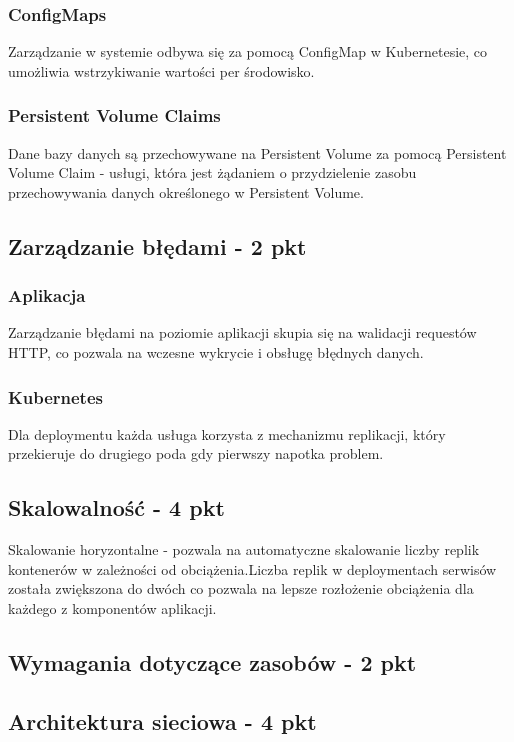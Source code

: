 \documentclass[12pt,a4paper]{article}
\begin{document}
\subsubsection {ConfigMaps} 
Zarządzanie w systemie odbywa się za pomocą ConfigMap w Kubernetesie, co umożliwia wstrzykiwanie wartości per środowisko.
\subsubsection {Persistent Volume Claims} 
Dane bazy danych są przechowywane na Persistent Volume za pomocą Persistent Volume Claim - usługi, która jest żądaniem o przydzielenie zasobu przechowywania danych określonego w Persistent Volume.

\subsection{Zarządzanie błędami - 2 pkt}
\label{sec:ERD} 
\subsubsection{Aplikacja}
Zarządzanie błędami na poziomie aplikacji skupia się na walidacji requestów HTTP, co pozwala na wczesne wykrycie i obsługę błędnych danych. 
\subsubsection{Kubernetes} 
Dla deploymentu każda usługa korzysta z mechanizmu replikacji, który przekieruje do drugiego poda gdy pierwszy napotka problem.

\subsection{Skalowalność - 4 pkt}
\label{sec:ExamplesSection}
Skalowanie horyzontalne - pozwala na automatyczne skalowanie liczby replik kontenerów w zależności od obciążenia.Liczba replik w deploymentach serwisów została zwiększona do dwóch co pozwala na lepsze rozłożenie obciążenia dla każdego z komponentów aplikacji.

\subsection{Wymagania dotyczące zasobów - 2 pkt}
\label{sec:ExampleTables}




\subsection{Architektura sieciowa - 4 pkt}
\label{sec:ExampleResults}
\end{document}
